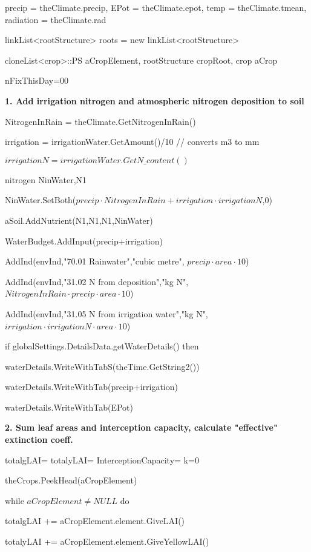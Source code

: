 \documentclass[%
]{scrartcl}
\begin{document}
     precip = theClimate.precip,      
     EPot = theClimate.epot,      
     temp = theClimate.tmean,      
     radiation = theClimate.rad

   linkList<rootStructure>  roots = new linkList<rootStructure>
   
   cloneList<crop>::PS aCropElement,   
   rootStructure  cropRoot,  
   crop aCrop
   
   nFixThisDay=00

   \textbf{1. Add irrigation nitrogen and atmospheric nitrogen deposition to soil}

     NitrogenInRain = theClimate.GetNitrogenInRain()
    
 irrigation = irrigationWater.GetAmount()/10         // converts m3 to mm
    
$ irrigationN = irrigationWater.GetN\_content()$
  
 nitrogen NinWater,N1
   
NinWater.SetBoth($precip \cdot NitrogenInRain+irrigation \cdot irrigationN$,0)
 
  aSoil.AddNutrient(N1,N1,N1,NinWater)
   
WaterBudget.AddInput(precip+irrigation)
  
 AddInd(envInd,"70.01 Rainwater","cubic metre",
$precip \cdot area \cdot 10$)
   
AddInd(envInd,"31.02 N from deposition","kg N",
$NitrogenInRain \cdot precip \cdot area \cdot 10$)
  
 AddInd(envInd,"31.05 N from irrigation water","kg N",
$irrigation \cdot irrigationN \cdot area \cdot 10$)

   if globalSettings.DetailsData.getWaterDetails() then
	
	  \quad   waterDetails.WriteWithTabS(theTime.GetString2())
	 
	  \quad   waterDetails.WriteWithTab(precip+irrigation)
 
  \quad	   waterDetails.WriteWithTab(EPot)

   \textbf{2. Sum leaf areas and interception capacity, calculate
   "effective" extinction coeff.}

   totalgLAI=
     totalyLAI=
     InterceptionCapacity=
     k=0
     
   theCrops.PeekHead(aCropElement)

   while $aCropElement\ne NULL$ do
   
  \quad 	totalgLAI            += aCropElement.element.GiveLAI()
   	
\quad totalyLAI            += aCropElement.element.GiveYellowLAI()
   	
\end{document}
